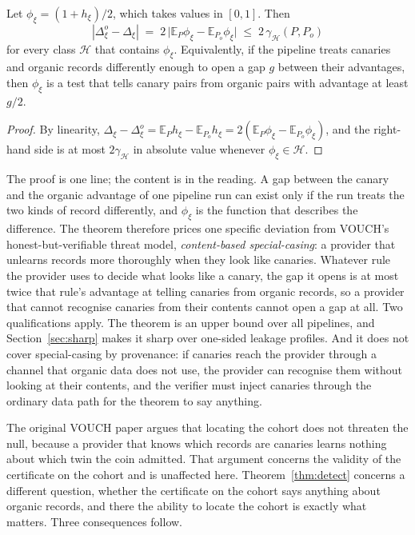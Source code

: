 \begin{theorem}\label{thm:detect}
Let $\phi_\xi=(1+h_\xi)/2$, which takes values in $[0,1]$. Then
\[
|\Delta^o_\xi-\Delta_\xi| \;=\; 2\,\bigl|\mathbb{E}_P\phi_\xi-\mathbb{E}_{P_o}\phi_\xi\bigr|
\;\le\; 2\,\gamma_{\mathcal H}(P,P_o)
\]
for every class $\mathcal H$ that contains $\phi_\xi$. Equivalently, if the pipeline
treats canaries and organic records differently enough to open a gap $g$ between their
advantages, then $\phi_\xi$ is a test that tells canary pairs from organic pairs with
advantage at least $g/2$.
\end{theorem}

\begin{proof}
By linearity, $\Delta_\xi-\Delta^o_\xi=\mathbb{E}_Ph_\xi-\mathbb{E}_{P_o}h_\xi
=2(\mathbb{E}_P\phi_\xi-\mathbb{E}_{P_o}\phi_\xi)$, and the right-hand side is at most
$2\gamma_{\mathcal H}$ in absolute value whenever $\phi_\xi\in\mathcal H$.
\end{proof}

The proof is one line; the content is in the reading. A gap between the canary and the
organic advantage of one pipeline run can exist only if the run treats the two kinds of
record differently, and $\phi_\xi$ is the function that describes the difference. The
theorem therefore prices one specific deviation from VOUCH's honest-but-verifiable
threat model, \emph{content-based special-casing}: a provider that unlearns records more
thoroughly when they look like canaries. Whatever rule the provider uses to decide what
looks like a canary, the gap it opens is at most twice that rule's advantage at telling
canaries from organic records, so a provider that cannot recognise canaries from their
contents cannot open a gap at all. Two qualifications apply. The theorem is an upper
bound over all pipelines, and Section~\ref{sec:sharp} makes it sharp over one-sided
leakage profiles. And it does not cover special-casing by provenance: if canaries reach the provider through a
channel that organic data does not use, the provider can recognise them without looking
at their contents, and the verifier must inject canaries through the ordinary data path
for the theorem to say anything.

The original VOUCH paper argues that locating the cohort does not threaten the null,
because a provider that knows which records are canaries learns nothing about which
twin the coin admitted. That argument concerns the validity of the certificate on the
cohort and is unaffected here. Theorem~\ref{thm:detect} concerns a different question,
whether the certificate on the cohort says anything about organic records, and there
the ability to locate the cohort is exactly what matters. Three consequences follow.

